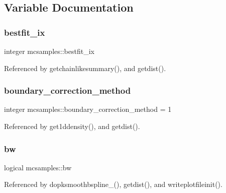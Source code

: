\subsection{Variable Documentation}
\mbox{\label{namespacemcsamples_ab3c722f8f5dd4ef38228bf41b333bf36}} 
\subsubsection{\texorpdfstring{bestfit\+\_\+ix}{bestfit\_ix}}
{\footnotesize\ttfamily integer mcsamples\+::bestfit\+\_\+ix}



Referenced by getchainlikesummary(), and getdist().

\mbox{\label{namespacemcsamples_a72368716a8ad215156d18cf044952cdc}} 
\subsubsection{\texorpdfstring{boundary\+\_\+correction\+\_\+method}{boundary\_correction\_method}}
{\footnotesize\ttfamily integer mcsamples\+::boundary\+\_\+correction\+\_\+method = 1}



Referenced by get1ddensity(), and getdist().

\mbox{\label{namespacemcsamples_abfadadd4fe7cc368f0f005a352298f33}} 
\subsubsection{\texorpdfstring{bw}{bw}}
{\footnotesize\ttfamily logical mcsamples\+::bw}



Referenced by dopksmoothbspline\+\_\+(), getdist(), and writeplotfileinit().

\mbox{\label{namespacemcsamples_a99b1b2fc1a0d5d3e797fa8716a294f6a}} 
